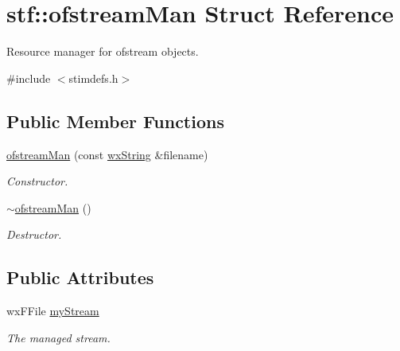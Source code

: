 \hypertarget{structstf_1_1ofstreamMan}{
\section{stf::ofstreamMan Struct Reference}
\label{structstf_1_1ofstreamMan}
}


Resource manager for ofstream objects.  




{\ttfamily \#include $<$stimdefs.h$>$}

\subsection*{Public Member Functions}
\begin{DoxyCompactItemize}
\item 
\hyperlink{structstf_1_1ofstreamMan_af35f6aa35d2d5fa6c26b70240201e271}{ofstreamMan} (const \hyperlink{classwxString}{wxString} \&filename)
\begin{DoxyCompactList}\small\item\em Constructor. \item\end{DoxyCompactList}\item 
\hypertarget{structstf_1_1ofstreamMan_a97a2b8af26519413012685fb6596b1ec}{
\hyperlink{structstf_1_1ofstreamMan_a97a2b8af26519413012685fb6596b1ec}{$\sim$ofstreamMan} ()}
\label{structstf_1_1ofstreamMan_a97a2b8af26519413012685fb6596b1ec}

\begin{DoxyCompactList}\small\item\em Destructor. \item\end{DoxyCompactList}\end{DoxyCompactItemize}
\subsection*{Public Attributes}
\begin{DoxyCompactItemize}
\item 
\hypertarget{structstf_1_1ofstreamMan_a9dd17bbd6aadc32a2d70a05bafd5c75e}{
wxFFile \hyperlink{structstf_1_1ofstreamMan_a9dd17bbd6aadc32a2d70a05bafd5c75e}{myStream}}
\label{structstf_1_1ofstreamMan_a9dd17bbd6aadc32a2d70a05bafd5c75e}

\begin{DoxyCompactList}\small\item\em The managed stream. \item\end{DoxyCompactList}\end{DoxyCompactItemize}



